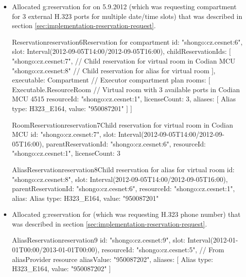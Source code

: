 \begin{itemize}
\item Allocated \gls{g:reservation} for \hyperref[oc:request3]{} on 5.9.2012 (which was requesting compartment for 3 external H.323 ports for multiple date/time slots) that was described in section \ref{sec:implementation-reservation-request}.
\begin{ObjectCode}{Reservation}{reservation6}{Reservation for compartment}
id: "shongo:cz.cesnet:6",
slot: Interval(2012-09-05T14:00/2012-09-05T16:00),
childReservationIds: [
  "shongo:cz.cesnet:7", // Child reservation for virtual room in Codian MCU
  "shongo:cz.cesnet:8"  // Child reservation for alias for virtual room
],
executable: Compartment { // Executor compartment plan  
  rooms: [
    Executable.ResourceRoom { // Virtual room with 3 available ports in Codian MCU 4515
      resourceId: "shongo:cz.cesnet:1",
      licenseCount: 3,
      aliases: [
        Alias { type: H323_E164, value: "950087201" }
      ]
    }
  ]
}
\end{ObjectCode}
\begin{ObjectCode}{RoomReservation}{reservation7}{Child reservation for virtual room in Codian MCU}
id: "shongo:cz.cesnet:7",
slot: Interval(2012-09-05T14:00/2012-09-05T16:00),
parentReservationId: "shongo:cz.cesnet:6",
resourceId: "shongo:cz.cesnet:1",
licenseCount: 3
\end{ObjectCode}
\begin{ObjectCode}{AliasReservation}{reservation8}{Child reservation for alias for virtual room}
id: "shongo:cz.cesnet:8",
slot: Interval(2012-09-05T14:00/2012-09-05T16:00),
parentReservationId: "shongo:cz.cesnet:6",
resourceId: "shongo:cz.cesnet:1",
alias: Alias { type: H323_E164, value: "950087201" }
\end{ObjectCode}

\item Allocated \gls{g:reservation} for \hyperref[oc:request4]{} (which was requesting H.323 phone number) that was described in section \ref{sec:implementation-reservation-request}.
\begin{ObjectCode}{AliasReservation}{reservation9}{}
id: "shongo:cz.cesnet:9",
slot: Interval(2012-01-01T00:00/2013-01-01T00:00),
resourceId: "shongo:cz.cesnet:5", // From aliasProvider resource
aliasValue: "950087202",
aliases: [
  Alias { type: H323_E164, value: "950087202"}
]
\end{ObjectCode}

\end{itemize}

